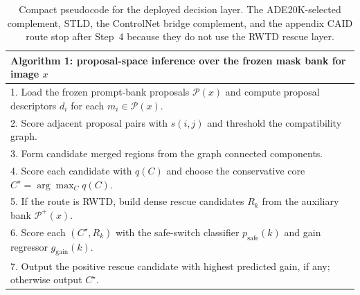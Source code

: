 \begin{table}[t]
\centering
\footnotesize
\setlength{\tabcolsep}{0pt}
\renewcommand{\arraystretch}{1.02}
\begin{tabularx}{\columnwidth}{@{}X@{}}
\toprule
\textbf{Algorithm 1: proposal-space inference over the frozen mask bank for image $x$} \\
\midrule
1. Load the frozen prompt-bank proposals $\mathcal{P}(x)$ and compute proposal descriptors $d_i$ for each $m_i \in \mathcal{P}(x)$. \\
2. Score adjacent proposal pairs with $s(i,j)$ and threshold the compatibility graph. \\
3. Form candidate merged regions from the graph connected components. \\
4. Score each candidate with $q(C)$ and choose the conservative core $C^\star = \arg\max_C q(C)$. \\
5. If the route is RWTD, build dense rescue candidates $R_k$ from the auxiliary bank $\mathcal{P}^{+}(x)$. \\
6. Score each $(C^\star, R_k)$ with the safe-switch classifier $p_{\mathrm{safe}}(k)$ and gain regressor $g_{\mathrm{gain}}(k)$. \\
7. Output the positive rescue candidate with highest predicted gain, if any; otherwise output $C^\star$. \\
\bottomrule
\end{tabularx}
\caption{Compact pseudocode for the deployed decision layer. The ADE20K-selected complement, STLD, the ControlNet bridge complement, and the appendix CAID route stop after Step~4 because they do not use the RWTD rescue layer.}
\label{tab:algorithm_box}
\end{table}
